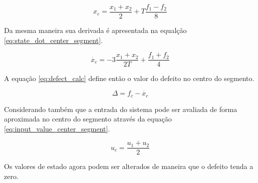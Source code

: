 \begin{equation}
    \label{eq:state_center_segment}
    x_c = \frac{x_{1} + x_{2}}{2} + T\frac{f_{1} - f_{2}}{8}
\end{equation}

Da mesma maneira sua derivada é apresentada na equalção \ref{eq:state_dot_center_segment}.

\begin{equation}
    \label{eq:state_dot_center_segment}
    \dot{x_{c}} = -3\frac{x_{1} + x_{2}}{2T} + \frac{f_{1} + f_{2}}{4}
\end{equation}

A equação \ref{eq:defect_calc} define então o valor do defeito no centro do segmento.

\begin{equation}
    \label{eq:defect_calc}
    \Delta = f_c - \dot{x_c}
\end{equation}

Considerando também que a entrada do sistema pode ser avaliada de forma aproximada no centro do segmento 
através da equação \ref{eq:input_value_center_segment}.

\begin{equation}
    \label{eq:input_value_center_segment}
    u_c = \frac{u_1 + u_2}{2}
\end{equation}

Os valores de estado agora podem ser alterados de maneira que o defeito tenda a zero.

